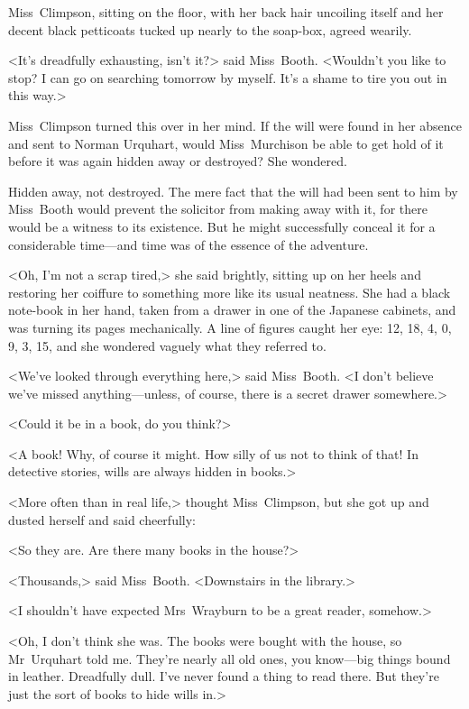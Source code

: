 Miss~Climpson, sitting on the floor, with her back hair uncoiling itself and her decent black petticoats tucked up nearly to the soap-box, agreed wearily.

<It's dreadfully exhausting, isn't it?> said Miss~Booth. <Wouldn't you like to stop? I can go on searching tomorrow by myself. It's a shame to tire you out in this way.>

Miss~Climpson turned this over in her mind. If the will were found in her absence and sent to Norman Urquhart, would Miss~Murchison be able to get hold of it before it was again hidden away or destroyed? She wondered.

Hidden away, not destroyed. The mere fact that the will had been sent to him by Miss~Booth would prevent the solicitor from making away with it, for there would be a witness to its existence. But he might successfully conceal it for a considerable time—and time was of the essence of the adventure.

<Oh, I'm not a scrap tired,> she said brightly, sitting up on her heels and restoring her coiffure to something more like its usual neatness. She had a black note-book in her hand, taken from a drawer in one of the Japanese cabinets, and was turning its pages mechanically. A line of figures caught her eye: 12, 18, 4, 0, 9, 3, 15, and she wondered vaguely what they referred to.

<We've looked through everything here,> said Miss~Booth. <I don't believe we've missed anything—unless, of course, there is a secret drawer somewhere.>

<Could it be in a book, do you think?>

<A book! Why, of course it might. How silly of us not to think of that! In detective stories, wills are always hidden in books.>

<More often than in real life,> thought Miss~Climpson, but she got up and dusted herself and said cheerfully:

<So they are. Are there many books in the house?>

<Thousands,> said Miss~Booth. <Downstairs in the library.>

<I shouldn't have expected Mrs~Wrayburn to be a great reader, somehow.>

<Oh, I don't think she was. The books were bought with the house, so Mr~Urquhart told me. They're nearly all old ones, you know—big things bound in leather. Dreadfully dull. I've never found a thing to read there. But they're just the sort of books to hide wills in.>

